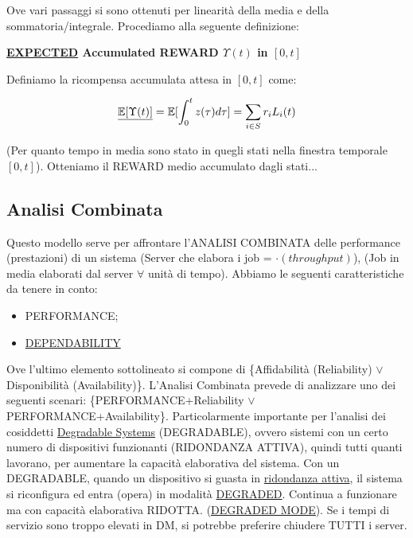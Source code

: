 Ove vari passaggi si sono ottenuti per linearità della media e della sommatoria/integrale. Procediamo alla seguente definizione:

\begin{defn}{\textbf{\underline{EXPECTED} Accumulated REWARD $\Upsilon(t)$ in $[0,t]$}}

Definiamo la ricompensa accumulata attesa in $[0,t]$ come:

\[
	\underline{\operatorname{\mathbb{E}}[\Upsilon(t)]} = \operatorname{\mathbb{E}}[\int_0^t{z(\tau)d\tau}] = \sum_{i\in S}{r_iL_i(t)}
\]

\end{defn}

(Per quanto tempo in media sono stato in quegli stati nella finestra temporale $[0,t]$). Otteniamo il REWARD medio accumulato dagli stati...

\subsection{Analisi Combinata}

Questo modello serve per affrontare l'ANALISI COMBINATA delle performance (prestazioni) di un sistema (Server che elabora i job = $\mathord{\cdot}(throughput)$), (Job in media elaborati dal server $\forall$ unità di tempo). Abbiamo le seguenti caratteristiche da tenere in conto:

\begin{itemize}

\item{PERFORMANCE};
\item{\underline{DEPENDABILITY}}
\end{itemize}

Ove l'ultimo elemento sottolineato si compone di \{Affidabilità (Reliability) $\lor$ Disponibilità (Availability)\}. L'Analisi Combinata prevede di analizzare uno dei seguenti scenari: \{PERFORMANCE+Reliability $\lor$ PERFORMANCE+Availability\}. Particolarmente importante per l'analisi dei cosiddetti \underline{Degradable Systems} (DEGRADABLE), ovvero sistemi con un certo numero di dispositivi funzionanti (RIDONDANZA ATTIVA), quindi tutti quanti lavorano, per aumentare la capacità elaborativa del sistema. Con un DEGRADABLE, quando un dispositivo si guasta in \underline{ridondanza attiva}, il sistema si riconfigura ed entra (opera) in modalità \underline{DEGRADED}. Continua a funzionare ma con capacità elaborativa RIDOTTA. (\underline{\underline{DEGRADED MODE}}). Se i tempi di servizio sono troppo elevati in DM, si potrebbe preferire chiudere TUTTI i server.

